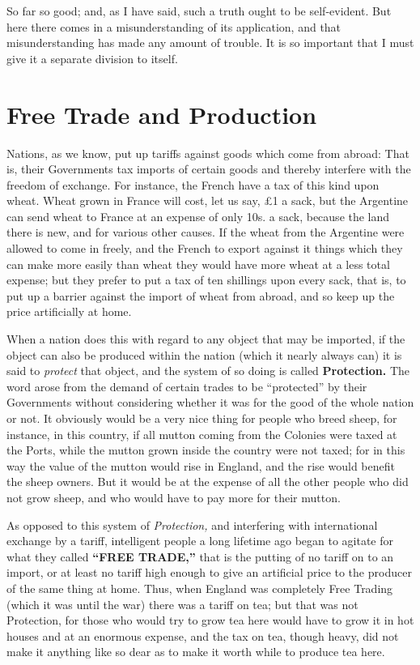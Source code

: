 \documentclass{book}
\begin{document}
So far so good; and, as I have said, such a truth ought to be self-evident. But here there comes in a misunderstanding of its application, and that misunderstanding has made any amount of trouble. It is so important that I must give it a separate division to itself.

\chapter{Free Trade and Production}
\label{chapter-6}
Nations, as we know, put up tariffs against goods which come from abroad: That is, their Governments tax imports of certain goods and thereby interfere with the freedom of exchange. For instance, the French have a tax of this kind upon wheat. Wheat grown in France will cost, let us say, £1 a sack, but the Argentine can send wheat to France at an expense of only 10s. a sack, because the land there is new, and for various other causes. If the wheat from the Argentine were allowed to come in freely, and the French to export against it things which they can make more easily than wheat they would have more wheat at a less total expense; but they prefer to put a tax of ten shillings upon every sack, that is, to put up a barrier against the import of wheat from abroad, and so keep up the price artificially at home.

When a nation does this with regard to any object that may be imported, if the object can also be produced within the nation (which it nearly always can) it is said to \emph{protect} that object, and the system of so doing is called \textbf{Protection.} The word arose from the demand of certain trades to be “protected” by their Governments without considering whether it was for the good of the whole nation or not. It obviously would be a very nice thing for people who breed sheep, for instance, in this country, if all mutton coming from the Colonies were taxed at the Ports, while the mutton grown inside the country were not taxed; for in this way the value of the mutton would rise in England, and the rise would benefit the sheep owners. But it would be at the expense of all the other people who did not grow sheep, and who would have to pay more for their mutton.

As opposed to this system of \emph{Protection,} and interfering with international exchange by a tariff, intelligent people a long lifetime ago began to agitate for what they called \textbf{“FREE TRADE,”} that is the putting of no tariff on to an import, or at least no tariff high enough to give an artificial price to the producer of the same thing at home. Thus, when England was completely Free Trading (which it was until the war) there was a tariff on tea; but that was not Protection, for those who would try to grow tea here would have to grow it in hot houses and at an enormous expense, and the tax on tea, though heavy, did not make it anything like so dear as to make it worth while to produce tea here.
\end{document}
